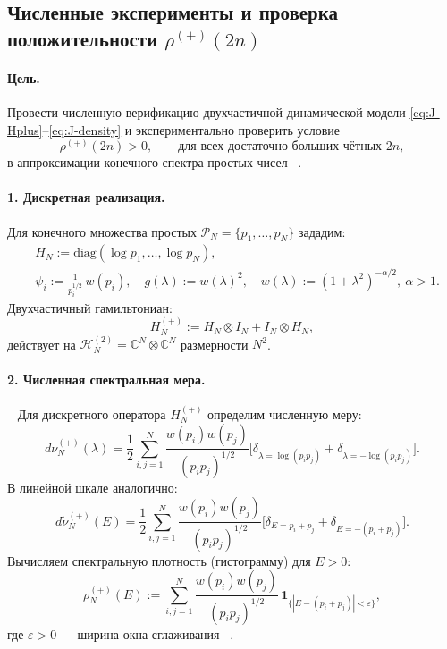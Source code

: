 \documentclass{article}
\numberwithin{equation}{section}
\theoremstyle{plain}
\theoremstyle{definition}
\theoremstyle{remark}
\def\alpha{α}\def\beta{β}\def\gamma{γ}\def\Gamma{Γ}%
\def\delta{δ}\def\Delta{Δ}\def\epsilon{ε}\def\zeta{ζ}%
\def\rho{ρ}\def\sigma{σ}\def\Sigma{Σ}\def\tau{τ}%
\begin{document}
\subsection*{Численные эксперименты и проверка положительности \texorpdfstring{$\rho^{(+)}(2n)$}{ρ⁽⁺⁾(2n)}}

\paragraph{Цель.}
Провести численную верификацию двухчастичной динамической модели \eqref{eq:J-Hplus}--\eqref{eq:J-density} и экспериментально проверить условие
\begin{equation}\label{eq:J-num-goal}
\rho^{(+)}(2n) > 0,\qquad \text{для всех достаточно больших чётных } 2n ,
\end{equation}
в аппроксимации конечного спектра простых чисел ~\cite{Trefethen2000}.

\paragraph{1. Дискретная реализация.}
Для конечного множества простых \(\mathcal P_N=\{p_1,\dots,p_N\}\) зададим:
\begin{align}
&H_N := \mathrm{diag}(\log p_1,\dots,\log p_N),\\[3pt]
&\psi_i := \frac{1}{p_i^{1/2}}\,w(p_i),\quad g(\lambda):=w(\lambda)^2,\quad w(\lambda):=(1+\lambda^2)^{-\alpha/2},\ \alpha>1 .
\end{align}
Двухчастичный гамильтониан:
\begin{equation}
H^{(+)}_N := H_N\otimes I_N + I_N\otimes H_N ,
\label{eq:J-Hplus}
\end{equation}
действует на \(\mathcal H_N^{(2)}=\mathbb C^N\otimes\mathbb C^N\) размерности \(N^2\).

\paragraph{2. Численная спектральная мера.}
~\cite{Monakhov-QSG-001}
Для дискретного оператора \(H^{(+)}_N\) определим численную меру:
\begin{equation}\label{eq:J-num-nu}
d\nu^{(+)}_N(\lambda)
=\frac12\sum_{i,j=1}^N
\frac{w(p_i)w(p_j)}{(p_i p_j)^{1/2}}
\big[\delta_{\lambda=\log(p_i p_j)}+\delta_{\lambda=-\log(p_i p_j)}\big].
\end{equation}
В линейной шкале аналогично:
\begin{equation}
d\tilde\nu^{(+)}_N(E)
=\frac12\sum_{i,j=1}^N
\frac{w(p_i)w(p_j)}{(p_i p_j)^{1/2}}
\big[\delta_{E=p_i+p_j}+\delta_{E=-(p_i+p_j)}\big].
\end{equation}
Вычисляем спектральную плотность (гистограмму) для \(E>0\):
\begin{equation}\label{eq:J-density}
\rho^{(+)}_N(E) := \sum_{i,j=1}^N \frac{w(p_i)w(p_j)}{(p_i p_j)^{1/2}}\,
\mathbf 1_{\{|E-(p_i+p_j)|<\varepsilon\}},
\end{equation}
где \(\varepsilon>0\) — ширина окна сглаживания ~\cite{Harris1978, Press2007}.
\end{document}
